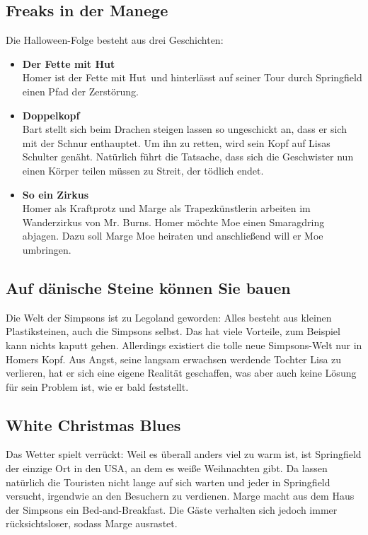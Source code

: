\subsection{Freaks in der Manege}
Die Halloween-Folge besteht aus drei Geschichten:
\begin{itemize}
	\item \textbf{Der Fette mit Hut}\\ Homer ist \glqq der Fette mit Hut\grqq\ und hinterlässt auf seiner Tour durch Springfield einen Pfad der Zerstörung.
	\item \textbf{Doppelkopf}\\ Bart stellt sich beim Drachen steigen lassen so ungeschickt an, dass er sich mit der Schnur enthauptet. Um ihn zu retten, wird sein Kopf auf Lisas Schulter genäht. Natürlich führt die Tatsache, dass sich die Geschwister nun einen Körper teilen müssen zu Streit, der tödlich endet.
	\item \textbf{So ein Zirkus}\\ Homer als Kraftprotz und Marge als Trapezkünstlerin arbeiten im Wanderzirkus von Mr. Burns. Homer möchte Moe einen Smaragdring abjagen. Dazu soll Marge Moe heiraten und anschließend will er Moe umbringen.
\end{itemize}


\subsection{Auf dänische Steine können Sie bauen}
Die Welt der Simpsons ist zu Legoland geworden: Alles besteht aus kleinen Plastiksteinen, auch die Simpsons selbst. Das hat viele Vorteile, zum Beispiel kann nichts kaputt gehen. Allerdings existiert die tolle neue Simpsons-Welt nur in Homers Kopf. Aus Angst, seine langsam erwachsen werdende Tochter Lisa zu verlieren, hat er sich eine eigene Realität geschaffen, was aber auch keine Lösung für sein Problem ist, wie er bald feststellt.


\subsection{White Christmas Blues}\label{SABF01}
Das Wetter spielt verrückt: Weil es überall anders viel zu warm ist, ist Springfield der einzige Ort in den USA, an dem es weiße Weihnachten gibt. Da lassen natürlich die Touristen nicht lange auf sich warten und jeder in Springfield versucht, irgendwie an den Besuchern zu verdienen. Marge macht aus dem Haus der Simpsons ein Bed-and-Breakfast. Die Gäste verhalten sich jedoch immer rücksichtsloser, sodass Marge ausrastet.

